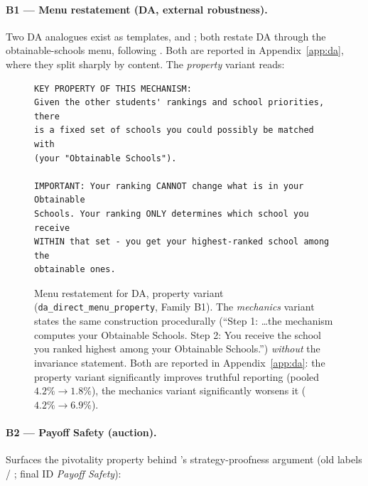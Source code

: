 \paragraph{B1 --- Menu restatement (DA, external robustness).} Two DA analogues exist as templates,  and ; both restate DA through the obtainable-schools menu, following \citet{gonczarowski2023strategyproofness}. Both are reported in Appendix~\ref{app:da}, where they split sharply by content. The \emph{property} variant reads:

\begin{figure}[H]
\begin{lstlisting}
KEY PROPERTY OF THIS MECHANISM:
Given the other students' rankings and school priorities, there
is a fixed set of schools you could possibly be matched with
(your "Obtainable Schools").

IMPORTANT: Your ranking CANNOT change what is in your Obtainable
Schools. Your ranking ONLY determines which school you receive
WITHIN that set - you get your highest-ranked school among the
obtainable ones.
\end{lstlisting}
\caption{Menu restatement for DA, property variant (\texttt{da\_direct\_menu\_property}, Family B1). The \emph{mechanics} variant states the same construction procedurally (``Step 1: \ldots the mechanism computes your Obtainable Schools. Step 2: You receive the school you ranked highest among your Obtainable Schools.'') \emph{without} the invariance statement. Both are reported in Appendix~\ref{app:da}: the property variant significantly improves truthful reporting (pooled $4.2\% \to 1.8\%$), the mechanics variant significantly worsens it ($4.2\% \to 6.9\%$).}
\label{fig:prompt-da-menu}
\end{figure}

\paragraph{B2 --- Payoff Safety (auction).} Surfaces the pivotality property behind \citet{vickrey1961counterspeculation}'s strategy-proofness argument (old labels  / ; final ID \emph{Payoff Safety}):

